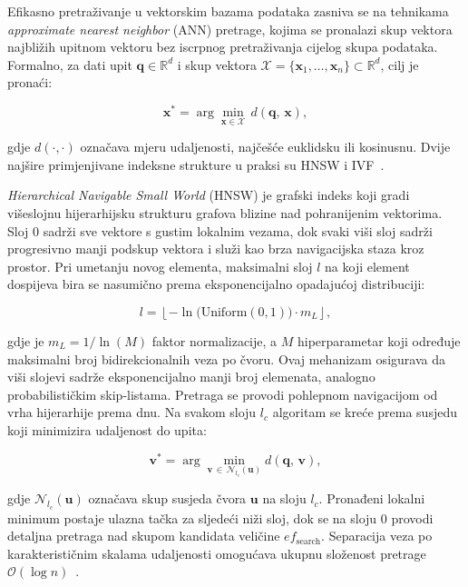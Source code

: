 Efikasno pretraživanje u vektorskim bazama podataka zasniva se na tehnikama
\foreignlanguage{english}{\emph{approximate nearest neighbor}} (ANN) pretrage,
kojima se pronalazi skup vektora najbližih upitnom vektoru bez iscrpnog
pretraživanja cijelog skupa podataka. Formalno,
za dati upit $\mathbf{q} \in \mathbb{R}^d$ i skup vektora
$\mathcal{X} = \{\mathbf{x}_1, \dots, \mathbf{x}_n\} \subset \mathbb{R}^d$,
cilj je pronaći:

\begin{equation}
    \mathbf{x}^* = \arg\min_{\mathbf{x} \in \mathcal{X}}
    \, d(\mathbf{q},\, \mathbf{x}),
    \label{eq:ann}
\end{equation}

\noindent gdje $d(\cdot,\cdot)$ označava mjeru udaljenosti, najčešće
euklidsku ili kosinusnu. Dvije najšire primjenjivane indeksne strukture
u praksi su HNSW i IVF~\cite{ma2026comprehensive}.

\foreignlanguage{english}{\emph{Hierarchical Navigable Small World}} (HNSW)
je grafski indeks koji gradi višeslojnu hijerarhijsku strukturu grafova
blizine nad pohranijenim vektorima. Sloj $0$
sadrži sve vektore s gustim lokalnim vezama, dok svaki viši sloj sadrži
progresivno manji podskup vektora i služi kao brza navigacijska staza kroz
prostor. Pri umetanju novog elementa, maksimalni sloj $l$ na koji element
dospijeva bira se nasumično prema eksponencijalno opadajućoj
distribuciji:

\begin{equation}
    l = \left\lfloor -\ln\!\bigl(\mathrm{Uniform}(0,1)\bigr)
        \cdot m_L \right\rfloor,
    \label{eq:hnsw_layer}
\end{equation}

\noindent gdje je $m_L = 1/\ln(M)$ faktor normalizacije, a $M$
hiperparametar koji određuje maksimalni broj bidirekcionalnih veza
po čvoru. Ovaj mehanizam osigurava da viši slojevi sadrže eksponencijalno
manji broj elemenata, analogno probabilističkim skip-listama.
Pretraga se provodi pohlepnom navigacijom od vrha hijerarhije prema
dnu. Na svakom sloju $l_c$ algoritam se kreće
prema susjedu koji minimizira udaljenost do upita:

\begin{equation}
    \mathbf{v}^* = \arg\min_{\mathbf{v}\,\in\,\mathcal{N}_{l_c}(\mathbf{u})}
    d(\mathbf{q},\,\mathbf{v}),
    \label{eq:hnsw_search}
\end{equation}

\noindent gdje $\mathcal{N}_{l_c}(\mathbf{u})$ označava skup susjeda čvora
$\mathbf{u}$ na sloju $l_c$. Pronađeni lokalni minimum postaje ulazna tačka
za sljedeći niži sloj, dok se na sloju $0$ provodi detaljna pretraga nad
skupom kandidata veličine $ef_{\mathrm{search}}$. Separacija veza po
karakterističnim skalama udaljenosti omogućava ukupnu složenost pretrage
$\mathcal{O}(\log n)$~\cite{malkov2018efficient}.

